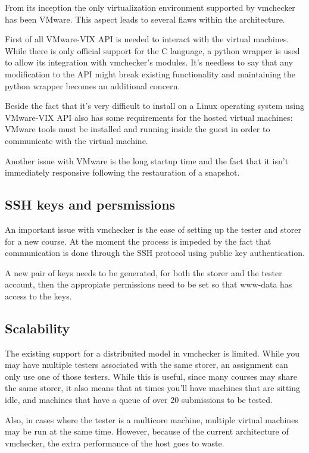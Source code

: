 From its inception the only virtualization environment supported by vmchecker 
has been VMware. This aspect leads to several flaws within the architecture.

First of all VMware-VIX API is needed to interact with the virtual machines. 
While there is only official support for the C language, a python wrapper is
used to allow its integration with vmchecker's modules. It's needless to say
that any modification to the API might break existing functionality and 
maintaining the python wrapper becomes an additional concern.

Beside the fact that it's very difficult to install on a Linux operating system
using VMware-VIX API also has some requirements for the hosted virtual machines:
VMware tools must be installed and running inside the guest in order to communicate
with the virtual machine.

Another issue with VMware is the long startup time and the fact that it isn't 
immediately responsive following the restauration of a snapshot.

\subsection{SSH keys and persmissions}
\label{sub-sec:vmc-analysis-ssh}

An important issue with vmchecker is the ease of setting up the tester and storer
for a new course. At the moment the process is impeded by the fact that communication
is done through the SSH protocol using public key authentication. 

A new pair of keys needs to be generated, for both the storer and the tester account,
then the appropiate permissions need to be set so that www-data has access to 
the keys.


\subsection{Scalability}
\label{sub-sec:vmc-analysis-scalability}

The existing support for a distribuited model in vmchecker is limited. While
you may have multiple testers associated with the same storer, an assignment
can only use one of those testers. While this is useful, since many courses
may share the same storer, it also means that at times you'll have machines
that are sitting idle, and machines that have a queue of over 20 submissions
to be tested.

Also, in cases where the tester is a multicore machine, multiple virtual
machines may be run at the same time. However, because of the current architecture 
of vmchecker, the extra performance of the host goes to waste.

